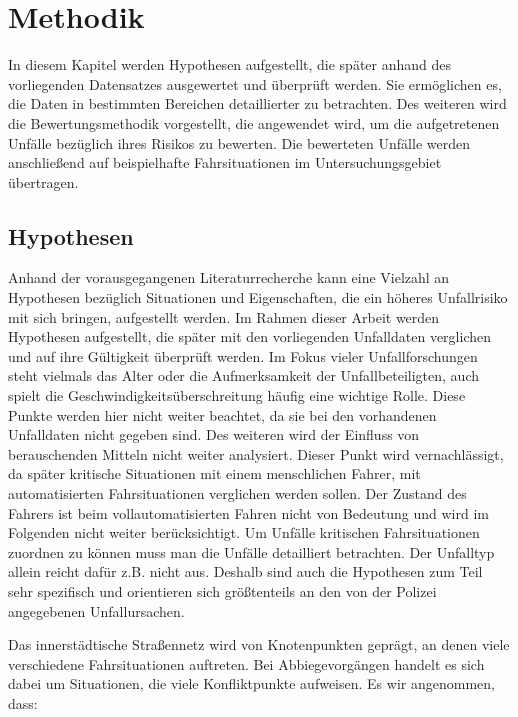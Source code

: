 
\chapter{Methodik}\label{chapter:Methodik}
In diesem Kapitel werden Hypothesen aufgestellt, die später anhand des vorliegenden Datensatzes ausgewertet und überprüft werden. Sie ermöglichen es, die Daten in bestimmten Bereichen detaillierter zu betrachten. Des weiteren wird die Bewertungsmethodik vorgestellt, die angewendet wird, um die aufgetretenen Unfälle bezüglich ihres Risikos zu bewerten. Die bewerteten Unfälle werden anschließend auf beispielhafte Fahrsituationen im Untersuchungsgebiet übertragen.

\section{Hypothesen}\label{section:Hypothesen}
Anhand der vorausgegangenen Literaturrecherche kann eine Vielzahl an Hypothesen bezüglich Situationen und Eigenschaften, die ein höheres Unfallrisiko mit sich bringen, aufgestellt werden. Im Rahmen dieser Arbeit werden Hypothesen aufgestellt, die später mit den vorliegenden Unfalldaten verglichen und auf ihre Gültigkeit überprüft werden. Im Fokus vieler Unfallforschungen steht vielmals das Alter oder die Aufmerksamkeit der Unfallbeteiligten, auch spielt die Geschwindigkeitsüberschreitung häufig eine wichtige Rolle. Diese Punkte werden hier nicht weiter beachtet, da sie bei den vorhandenen Unfalldaten nicht gegeben sind. Des weiteren wird der Einfluss von berauschenden Mitteln nicht weiter analysiert. Dieser Punkt wird vernachlässigt, da später kritische Situationen mit einem menschlichen Fahrer, mit automatisierten Fahrsituationen verglichen werden sollen. Der Zustand des Fahrers ist beim vollautomatisierten Fahren nicht von Bedeutung und wird im Folgenden nicht weiter berücksichtigt. Um Unfälle kritischen Fahrsituationen zuordnen zu können muss man die Unfälle detailliert betrachten. Der Unfalltyp allein reicht dafür z.B. nicht aus. Deshalb sind auch die Hypothesen zum Teil sehr spezifisch und orientieren sich größtenteils an den von der Polizei angegebenen Unfallursachen.

Das innerstädtische Straßennetz wird von Knotenpunkten geprägt, an denen viele verschiedene Fahrsituationen auftreten. Bei Abbiegevorgängen handelt es sich dabei um Situationen, die viele Konfliktpunkte aufweisen. Es wir angenommen, dass:


